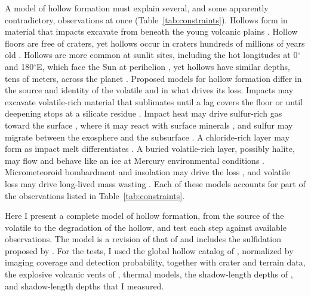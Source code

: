 \documentclass[article,review]{planetary}
\begin{document}
A model of hollow formation must explain several, and some apparently contradictory, observations at once (Table~\ref{tab:constraints}). Hollows form in material that impacts excavate from beneath the young volcanic plains \parencite{blewett2013,thomas2014}. Hollow floors are free of craters, yet hollows occur in craters hundreds of millions of years old \parencite{blewett2016,wang2020}. Hollows are more common at sunlit sites, including the hot longitudes at 0$^\circ$ and 180$^\circ$E, which face the Sun at perihelion \parencite{detoffoli2024,deutsch2025}, yet hollows have similar depths, tens of meters, across the planet \parencite{vaughan2012,blewett2013,thomas2014,blewett2016}. Proposed models for hollow formation differ in the source and identity of the volatile and in what drives its loss. Impacts may excavate volatile-rich material that sublimates until a lag covers the floor \parencite{blewett2013,blewett2016} or until deepening stops at a silicate residue \parencite{emran2025}. Impact heat may drive sulfur-rich gas toward the surface \parencite{phillips2021}, where it may react with surface minerals \parencite{renggli2022}, and sulfur may migrate between the exosphere and the subsurface \parencite{verkercke2025}. A chloride-rich layer may form as impact melt differentiates \parencite{vaughan2012,lucchetti2021}. A buried volatile-rich layer, possibly halite, may flow and behave like an ice at Mercury environmental conditions \parencite{rodriguez2020,rodriguez2023,domingue2025}. Micrometeoroid bombardment and insolation may drive the loss \parencite{bickel2025}, and volatile loss may drive long-lived mass wasting \parencite{wright2020}. Each of these models accounts for part of the observations listed in Table~\ref{tab:constraints}.

Here I present a complete model of hollow formation, from the source of the volatile to the degradation of the hollow, and test each step against available observations. The model is a revision of that of \textcite{phillips2021} and includes the sulfidation proposed by \textcite{renggli2022}. For the tests, I used the global hollow catalog of \textcite{bickel2025}, normalized by imaging coverage and detection probability, together with crater and terrain data, the explosive volcanic vents of \textcite{pegg2021}, thermal models, the shadow-length depths of \textcite{blewett2016}, and shadow-length depths that I measured.
\end{document}
